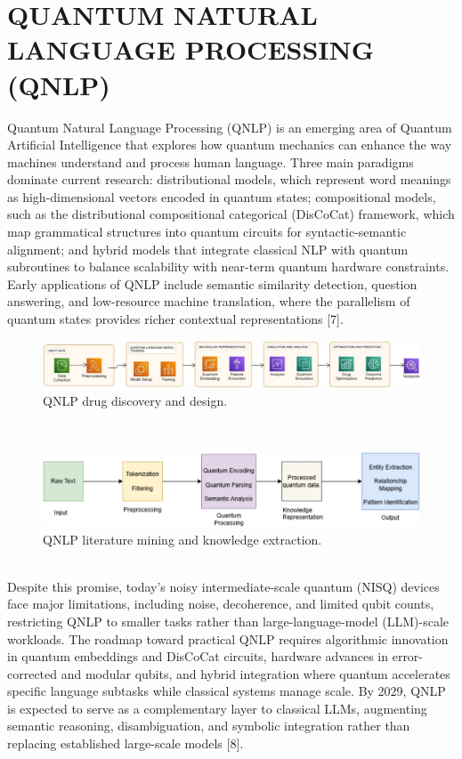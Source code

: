 \chapter{QUANTUM NATURAL LANGUAGE PROCESSING (QNLP)}
\hspace*{0.3in}Quantum Natural Language Processing (QNLP) is an emerging area of Quantum Artificial Intelligence that explores how quantum mechanics can enhance the way machines understand and process human language. Three main paradigms dominate current research: distributional models, which represent word meanings as high-dimensional vectors encoded in quantum states; compositional models, such as the distributional compositional categorical (DisCoCat) framework, which map grammatical structures into quantum circuits for syntactic-semantic alignment; and hybrid models that integrate classical NLP with quantum subroutines to balance scalability with near-term quantum hardware constraints. Early applications of QNLP include semantic similarity detection, question answering, and low-resource machine translation, where the parallelism of quantum states provides richer contextual representations [7].\\
\begin{figure}[htbp]
	\centering
	\includegraphics[width=1\linewidth]{qnlpD.jpg}
	\caption{QNLP drug discovery and design.}
	\label{fig:enter-label}
\end{figure}
\\
\begin{figure}[htbp]
	\centering
	\includegraphics[width=1\linewidth]{qnlpG.jpg}
	\caption{QNLP literature mining and knowledge extraction.}
	\label{fig:enter-label}
\end{figure}
\\
\hspace*{0.3in}Despite this promise, today’s noisy intermediate-scale quantum (NISQ) devices face major limitations, including noise, decoherence, and limited qubit counts, restricting QNLP to smaller tasks rather than large-language-model (LLM)-scale workloads. The roadmap toward practical QNLP requires algorithmic innovation in quantum embeddings and DisCoCat circuits, hardware advances in error-corrected and modular qubits, and hybrid integration where quantum accelerates specific language subtasks while classical systems manage scale. By 2029, QNLP is expected to serve as a complementary layer to classical LLMs, augmenting semantic reasoning, disambiguation, and symbolic integration rather than replacing established large-scale models [8].
